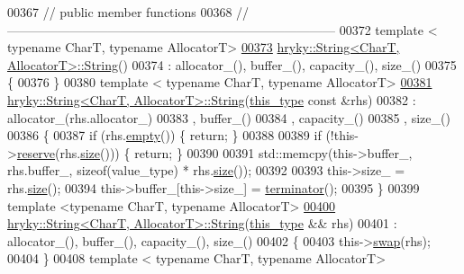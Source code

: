 \begin{DoxyCode}
00367 \textcolor{comment}{// public member functions}
00368 \textcolor{comment}{//
      ------------------------------------------------------------------------------}
00372 \textcolor{comment}{}\textcolor{keyword}{template} < \textcolor{keyword}{typename} CharT, \textcolor{keyword}{typename} AllocatorT>
\hypertarget{string_8h_source_l00373}{}\hyperlink{classhryky_1_1_string_ad60595ccc01ad3a9c1c32b9c7eb0a115}{00373} \hyperlink{classhryky_1_1_string_ad60595ccc01ad3a9c1c32b9c7eb0a115}{hryky::String<CharT, AllocatorT>::String}()
00374     : allocator\_(), buffer\_(), capacity\_(), size\_()
00375 \{
00376 \}
00380 \textcolor{keyword}{template} < \textcolor{keyword}{typename} CharT, \textcolor{keyword}{typename} AllocatorT>
\hypertarget{string_8h_source_l00381}{}\hyperlink{classhryky_1_1_string_a5f2897c6c0c4c57fdb7f7d46fdc89817}{00381} \hyperlink{classhryky_1_1_string}{hryky::String<CharT, AllocatorT>::String}(\hyperlink{classhryky_1_1_string}{this_type} \textcolor{keyword}{const} &rhs)
00382     : allocator\_(rhs.allocator\_)
00383       , buffer\_()
00384       , capacity\_()
00385       , size\_()
00386 \{
00387     \textcolor{keywordflow}{if} (rhs.\hyperlink{classhryky_1_1_string_aff01fafe438f65219695edae5459ed31}{empty}()) \{ \textcolor{keywordflow}{return}; \}
00388     
00389     \textcolor{keywordflow}{if} (!this->\hyperlink{classhryky_1_1_string_aae6ce7131e8bb4c2cf03689a6a183b8d}{reserve}(rhs.\hyperlink{classhryky_1_1_string_a9db0f71dce7b2de86a54ab5323759265}{size}())) \{ \textcolor{keywordflow}{return}; \}
00390 
00391     std::memcpy(this->buffer\_, rhs.buffer\_, \textcolor{keyword}{sizeof}(value\_type) * rhs.\hyperlink{classhryky_1_1_string_a9db0f71dce7b2de86a54ab5323759265}{size}());
00392 
00393     this->size\_ = rhs.\hyperlink{classhryky_1_1_string_a9db0f71dce7b2de86a54ab5323759265}{size}();
00394     this->buffer\_[this->size\_] = \hyperlink{classhryky_1_1_string_ab1308696e8665314373d9aec581a3095}{terminator}();
00395 \}
00399 \textcolor{keyword}{template} <\textcolor{keyword}{typename} CharT, \textcolor{keyword}{typename} AllocatorT>
\hypertarget{string_8h_source_l00400}{}\hyperlink{classhryky_1_1_string_af752573e708f1a541385d376f4a6729e}{00400} \hyperlink{classhryky_1_1_string}{hryky::String<CharT, AllocatorT>::String}(\hyperlink{classhryky_1_1_string}{this_type} && rhs)
00401     : allocator\_(), buffer\_(), capacity\_(), size\_()
00402 \{
00403     this->\hyperlink{classhryky_1_1_string_a5ff47f11c86f2cf71e7e2d1427c1474b}{swap}(rhs);
00404 \}
00408 \textcolor{keyword}{template} < \textcolor{keyword}{typename} CharT, \textcolor{keyword}{typename} AllocatorT>

\end{DoxyCode}
